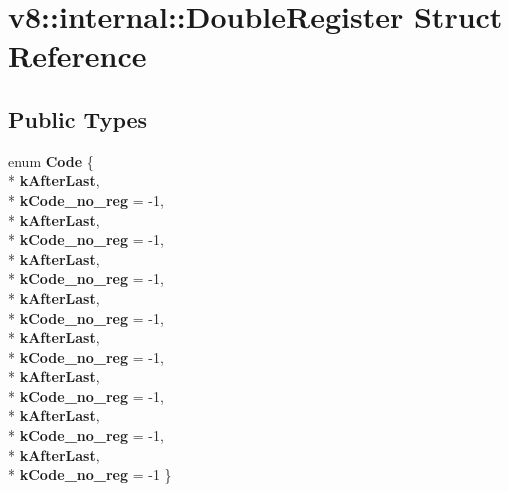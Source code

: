 \hypertarget{structv8_1_1internal_1_1_double_register}{}\section{v8\+:\+:internal\+:\+:Double\+Register Struct Reference}
\label{structv8_1_1internal_1_1_double_register}
\subsection*{Public Types}
\begin{DoxyCompactItemize}
\item 
enum {\bfseries Code} \{ \\*
{\bfseries k\+After\+Last}, 
\\*
{\bfseries k\+Code\+\_\+no\+\_\+reg} = -\/1, 
\\*
{\bfseries k\+After\+Last}, 
\\*
{\bfseries k\+Code\+\_\+no\+\_\+reg} = -\/1, 
\\*
{\bfseries k\+After\+Last}, 
\\*
{\bfseries k\+Code\+\_\+no\+\_\+reg} = -\/1, 
\\*
{\bfseries k\+After\+Last}, 
\\*
{\bfseries k\+Code\+\_\+no\+\_\+reg} = -\/1, 
\\*
{\bfseries k\+After\+Last}, 
\\*
{\bfseries k\+Code\+\_\+no\+\_\+reg} = -\/1, 
\\*
{\bfseries k\+After\+Last}, 
\\*
{\bfseries k\+Code\+\_\+no\+\_\+reg} = -\/1, 
\\*
{\bfseries k\+After\+Last}, 
\\*
{\bfseries k\+Code\+\_\+no\+\_\+reg} = -\/1, 
\\*
{\bfseries k\+After\+Last}, 
\\*
{\bfseries k\+Code\+\_\+no\+\_\+reg} = -\/1
 \}\hypertarget{structv8_1_1internal_1_1_double_register_a3bfd17e6e3d18cfe1c2fefe364430d19}{}\label{structv8_1_1internal_1_1_double_register_a3bfd17e6e3d18cfe1c2fefe364430d19}


\end{DoxyCompactItemize}
